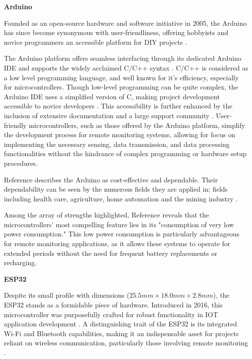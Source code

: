 \documentclass[class=report,11pt,crop=false]{standalone}
\begin{document}
\textbf{Arduino} 

Founded as an open-source hardware and software initiative in 2005, the Arduino has since become synonymous with user-friendliness, offering hobbyists and novice programmers an accessible platform for \acrfull{DIY} projects \cite{systemArduino} \cite{ArduinoCCTV}.

The Arduino platform offers seamless interfacing through its dedicated Arduino \acrfull{IDE} and supports the widely acclaimed C/C++ syntax \cite{systemArduino}.  C/C++ is considered as a low level programming language, and well known for it's efficiency, especially for microcontrollers. Though low-level programming can be quite complex, the Arduino \acrshort{IDE} uses a simplified version of C, making project development accessible to novice developers \cite{PerformanceC++} \cite{systemArduino}.  This accessibility is further enhanced by the inclusion of  extensive documentation and a large support community \cite{systemArduino}. User-friendly microcontrollers, such as those offered by the Arduino platform, simplify the development process for remote monitoring systems, allowing for focus on implementing the necessary sensing, data transmission, and data processing functionalities without the hindrance of complex programming or hardware setup procedures. 

Reference \cite{systemArduino}  describes the Arduino as cost-effective and dependable. Their dependability can be seen by the numerous  fields they are applied in; fields including health care, agriculture,  home automation and the mining industry \cite{systemArduino} \cite{ArduinoCCTV}. 

Among the array of strengths highlighted, Reference \cite{systemArduino} reveals that the microcontrollers' most compelling feature lies in its "consumption of very low power consumption." This low power consumption is particularly advantageous for remote monitoring applications, as it allows these systems to operate for extended periods without the need for frequent battery replacements or recharging.

\textbf{ESP32}

Despite its small profile with dimensions ($25.5mm \times 18.0mm \times 2.8mm$), the ESP32 stands as a formidable piece of hardware. Introduced in 2016, this microcontroller was purposefully crafted for robust functionality in \acrfull{IOT} application development \cite{ESP32Design}. A distinguishing trait of the ESP32 is its integrated Wi-Fi and Bluetooth capabilities, making it an indispensable asset for projects reliant on wireless communication, particularly those involving remote monitoring \cite{ESPComp}. 
\end{document}
